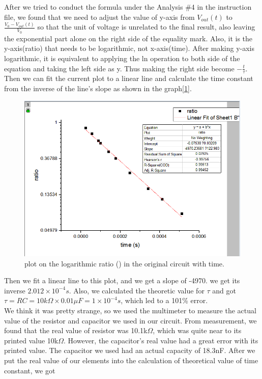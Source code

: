 \phantom{ }After we tried to conduct the formula under the Analysis \#4 in the instruction file, we found that we need to adjust the value of y-axis from $V_{out}(t)$ to $\frac{V_0 - V_{out}(t)}{V_0}$ so that the unit of voltage is unrelated to the final result, also leaving the exponential part alone on the right side of the equality mark. Also, it is the y-axis(ratio) that needs to be logarithmic, not x-axis(time). After making y-axis logarithmic, it is equivalent to applying the ln operation to both side of the equation and taking the left side as y. Thus making the right side become $-\frac{t}{\tau}$. Then we can fit the current plot to a linear line and calculate the time constant from the inverse of the line's slope as shown in the graph[\ref{fig:2.2}].\\
\begin{figure}[!htbp]
	\centering %
	\includegraphics[width=\linewidth]{images/2_2.PNG} %
	\caption{plot on the logarithmic ratio ({\tiny }) in the original circuit with time.} %
	\label{fig:2.2} %
\end{figure}
Then we fit a linear line to this plot, and we get a slope of -4970.
we get its inverse $2.012\times10^{-4}s$. Also, we calculated the theoretic value for $\tau$ and got 
$\tau = RC = 10k\Omega \times 0.01\mu F = 1\times10^{-4}s$, which led to a 101\% error.\\
We think it was pretty strange, so we used the multimeter to measure the actual value of the resistor and capacitor we used in our circuit. From measurement, we found that the real value of resistor was 10.1k$\Omega$, which was quite near to its printed value 10k$\Omega$. However, the capacitor's real value had a great error with its printed value. The capacitor we used had an actual capacity of 18.3nF. After we put the real value of our elements into the calculation of theoretical value of time constant, we got \\
